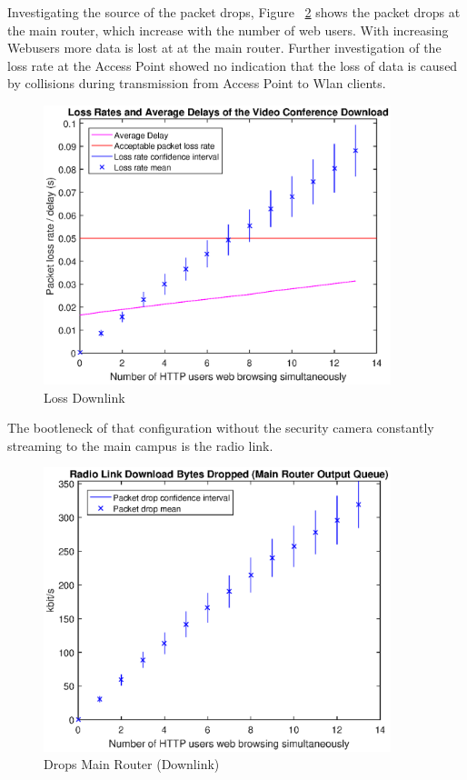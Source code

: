 \documentclass[a4paper,10pt]{book}\usepackage{graphicx}
\begin{document}
Investigating the source of the packet drops, Figure ~\ref{fig:mainRdrops} shows the packet drops at the main router, which increase with the number of 
web users. With increasing Webusers more data is lost at at the main router. Further investigation of the loss rate at the Access Point showed no indication that 
the loss of data is caused by collisions during transmission from Access Point to Wlan clients.

\begin{figure}[!ht]
  \centering
    \label{fig:losslecdown}
    \includegraphics[width=0.9\textwidth]{off_loss_conf_download.eps}
  
    \caption{Loss Downlink}
\end{figure}
The bootleneck of that configuration without the security camera constantly streaming to the main campus 
is the radio link.
\begin{figure}[!ht]
 \label{fig:mainRdrops}
  \centering
    \includegraphics[width=0.9\textwidth]{off_main_router_drops.eps}
    \caption{Drops Main Router (Downlink)}
\end{figure}
\end{document}
